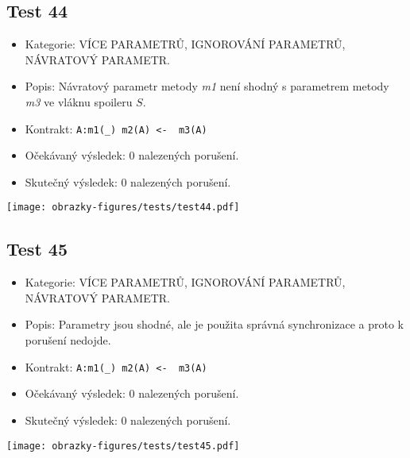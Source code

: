 \subsection*{Test 44}
\begin{itemize}
\item Kategorie: VÍCE PARAMETRŮ, IGNOROVÁNÍ PARAMETRŮ, NÁVRATOVÝ PARAMETR.
\item Popis: Návratový parametr metody \textit{m1} není shodný s parametrem metody \textit{m3} ve vláknu spoileru $S$. 
\item Kontrakt: \texttt{A:m1(_) m2(A) <- { m3(A) }}
\item Očekávaný výsledek: 0 nalezených porušení.

\item Skutečný výsledek: 0 nalezených porušení.
\end{itemize}
\begin{center}
    \centering
    \texttt{[image: obrazky-figures/tests/test44.pdf]}
    \label{test44}
\end{center}
\subsection*{Test 45}
\begin{itemize}
\item Kategorie: VÍCE PARAMETRŮ, IGNOROVÁNÍ PARAMETRŮ, NÁVRATOVÝ PARAMETR.
\item Popis: Parametry jsou shodné, ale je použita správná synchronizace a proto k porušení nedojde. 
\item Kontrakt: \texttt{A:m1(_) m2(A) <- { m3(A) }}
\item Očekávaný výsledek: 0 nalezených porušení.

\item Skutečný výsledek: 0 nalezených porušení.
\end{itemize}
\begin{center}
    \centering
    \texttt{[image: obrazky-figures/tests/test45.pdf]}
    \label{test45}
\end{center}

